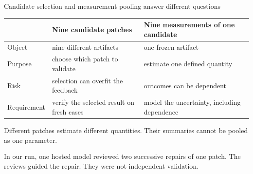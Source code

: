 \begin{frame}[t]{\ev{\tagM}Candidate selection and measurement pooling answer different questions}
\vspace{0pt}
{\small
\begin{tabularx}{\linewidth}{@{}L{2.3cm}YY@{}}
\toprule
 & \textbf{Nine candidate patches} & \textbf{Nine measurements of one candidate}\\
\midrule
Object & nine different artifacts & one frozen artifact\\
Purpose & choose which patch to validate & estimate one defined quantity\\
Risk & selection can overfit the feedback & outcomes can be dependent\\
Requirement & verify the selected result on fresh cases & model the uncertainty, including dependence\\
\bottomrule
\end{tabularx}\par}
\vspace{.25cm}
{\small Different patches estimate different quantities. Their summaries cannot be pooled as one parameter.\par}
\vspace{.12cm}
{\small In our run, one hosted model reviewed two successive repairs of one patch. The reviews guided the repair. They were not independent validation.\par}
\end{frame}
